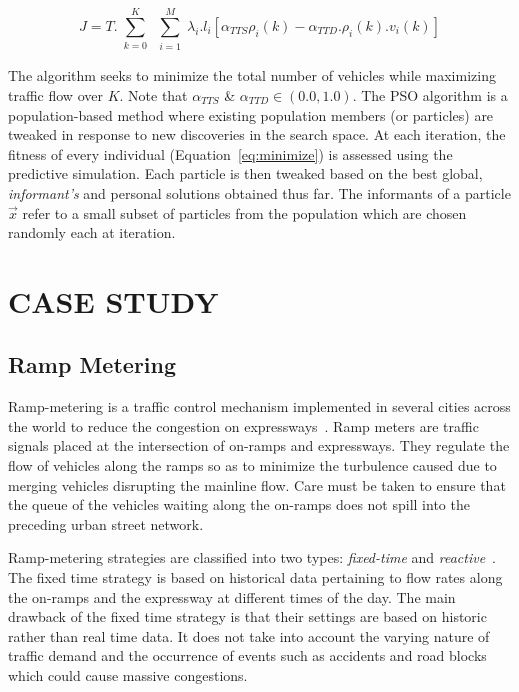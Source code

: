 \documentclass[12pt]{article}
\begin{document}
 

\begin{equation}
\label{eq:minimize}
J=T.\sum\limits_{\substack{k=0}}^{K}\sum\limits_{\substack{i=1}}^{M}\lambda_i.l_i[\alpha_{TTS}\rho_i(k)-\alpha_{TTD}.\rho_i(k).v_i(k)]
\end{equation}

The algorithm seeks to minimize the total number of vehicles while maximizing traffic flow over $K$. Note that $\alpha_{TTS}$ \& $\alpha_{TTD} \in (0.0,1.0)$. The PSO algorithm is a population-based method where existing population members (or particles) are tweaked in response to new discoveries in the search space. At each iteration, the fitness of every individual (Equation~\ref{eq:minimize}) is assessed using the predictive simulation. Each particle is then tweaked based on the best global, {\it informant's} and personal solutions obtained thus far. The informants of a particle $\vec{x}$ refer to a small subset of particles from the population which are chosen randomly each at iteration.


\section{CASE STUDY}
\label{sec:case-study}
\subsection{Ramp Metering}
\label{subsec:ramp-metering}
Ramp-metering is a traffic control mechanism implemented in several cities across the world to reduce the congestion on expressways~\cite{bogenberger1999advanced}. Ramp meters are traffic signals placed at the intersection of on-ramps and expressways. They regulate the flow of vehicles along the ramps so as to minimize the turbulence caused due to merging vehicles disrupting the mainline flow. Care must be taken to ensure that the queue of the vehicles waiting along the on-ramps does not spill into the preceding urban street network. 

Ramp-metering strategies are classified into two types: {\it fixed-time} and {\it reactive}~\cite{papageorgiou2003review}. The fixed time strategy is based on historical data pertaining to flow rates along the on-ramps and the expressway at different times of the day. The main drawback of the fixed time strategy is that their settings are based on historic rather than real time data. It does not take into account the varying nature of traffic demand and the occurrence of events such as accidents and road blocks which could cause massive congestions. 
\end{document}
